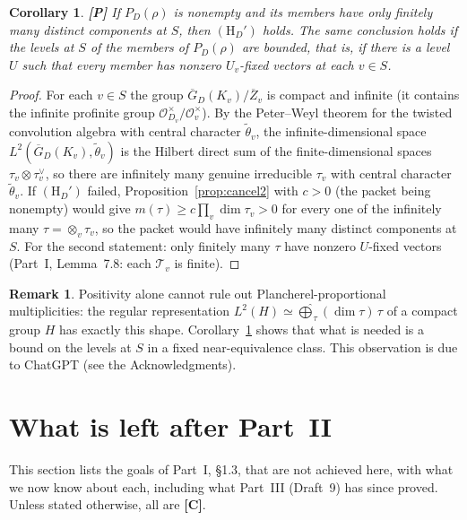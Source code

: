 \documentclass[12pt]{article}
\newcommand{\ov}[1]{\overline{#1}}
\newcommand{\cO}{\mathcal{O}}
\newcommand{\Zb}{\ov{Z}}
\newcommand{\GDb}{\ov{G}_D}
\newcommand{\Pv}{\textbf{[P]}}
\newcommand{\Cv}{\textbf{[C]}}
\theoremstyle{plain}
\newtheorem{corollary}[theorem]{Corollary}
\theoremstyle{definition}
\newtheorem{remark}[theorem]{Remark}
\begin{document}
\begin{corollary}\label{cor:finiteStypes}\Pv
If $P_D(\rho)$ is nonempty and its members have only finitely many distinct components at $S$, then $(\mathrm H_D')$ holds. The same conclusion holds if the levels at $S$ of the members of $P_D(\rho)$ are bounded, that is, if there is a level $U$ such that every member has nonzero $U_v$-fixed vectors at each $v\in S$.
\end{corollary}
\begin{proof}
For each $v\in S$ the group $\GDb(K_v)/\Zb_v$ is compact and infinite (it contains the infinite profinite group $\cO_{D_v}^\times/\cO_v^\times$). By the Peter--Weyl theorem for the twisted convolution algebra with central character $\tilde\theta_v$, the infinite-dimensional space $L^2(\GDb(K_v),\tilde\theta_v)$ is the Hilbert direct sum of the finite-dimensional spaces $\tau_v\otimes\tau_v^\vee$, so there are infinitely many genuine irreducible $\tau_v$ with central character $\tilde\theta_v$. If $(\mathrm H_D')$ failed, Proposition~\ref{prop:cancel2} with $c>0$ (the packet being nonempty) would give $m(\tau)\ge c\prod_v\dim\tau_v>0$ for every one of the infinitely many $\tau=\otimes_v\tau_v$, so the packet would have infinitely many distinct components at $S$. For the second statement: only finitely many $\tau$ have nonzero $U$-fixed vectors (Part~I, Lemma~7.8: each $\mathcal T_v$ is finite).
\end{proof}

\begin{remark}
Positivity alone cannot rule out Plancherel-proportional multiplicities: the regular representation $L^2(H)\simeq\widehat\bigoplus_\tau(\dim\tau)\,\tau$ of a compact group $H$ has exactly this shape. Corollary~\ref{cor:finiteStypes} shows that what is needed is a bound on the levels at $S$ in a fixed near-equivalence class. This observation is due to ChatGPT (see the Acknowledgments).
\end{remark}

\section{What is left after Part~II}\label{sec:partIII}
This section lists the goals of Part~I, \S1.3, that are not achieved here, with what we now know about each, including what Part~III (Draft~9) has since proved. Unless stated otherwise, all are \Cv.
\end{document}
